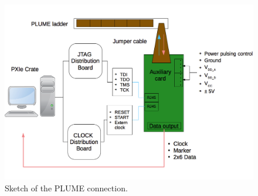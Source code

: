 


  \begin{figure}[!h]
    \centering
    \includegraphics[width=\textwidth]{Pictures/labTests/plumeAux.png}
    \caption{Sketch of the PLUME connection.}
    \label{fig:plumeAux}
  \end{figure}


